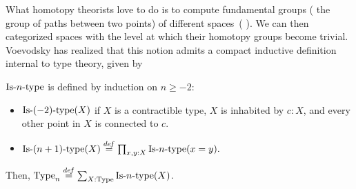 What homotopy theorists love to do is to compute fundamental groups
(\ie{} the group of paths between two points) of
different spaces~(\cite{wangxu}
\cite{hutchings2011introduction}). We
can then categorized spaces with the level at which their homotopy
groups become trivial. Voevodsky has realized that this notion admits
a compact inductive definition internal to type theory, given by
\begin{defi}
  $\mathop{\mathrm{Is{\hbox{-}}}n\mathrm{{\hbox{-}} type}}$ is defined by induction on $n\geqslant -2$:
  \begin{itemize}
  \item $\mathop{\mathrm{Is{\hbox{-}}}(-2)\mathrm{{\hbox{-}} type}}(X)$ if $X$ is a contractible type, \ie{} $X$
    is inhabited by $c:X$, and every other point in $X$ is connected to $c$.
  \item $\mathop{\mathrm{Is{\hbox{-}}}(n+1)\mathrm{{\hbox{-}} type}}(X) \overset{de\hspace{-0.2ex}f}{=} \prod_{x,y:X} \mathop{\mathrm{Is{\hbox{-}}}n\mathrm{{\hbox{-}} type}} (x=y).$
  \end{itemize}
  Then, $\operatorname{Type}_n \overset{de\hspace{-0.2ex}f}{=} \sum_{X:\operatorname{Type}} \mathop{\mathrm{Is{\hbox{-}}}n\mathrm{{\hbox{-}} type}}(X)$.
\end{defi}

